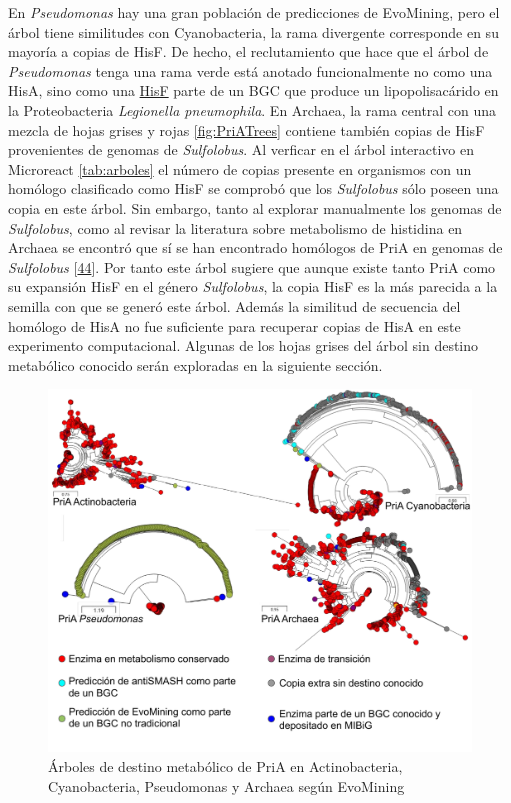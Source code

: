 \documentclass[12pt,twoside]{reedthesis}
\begin{document}
  En \emph{Pseudomonas} hay una gran población de predicciones de
  EvoMining, pero el árbol tiene similitudes con Cyanobacteria, la rama
  divergente corresponde en su mayoría a copias de HisF. De hecho, el
  reclutamiento que hace que el árbol de \emph{Pseudomonas} tenga una rama
  verde está anotado funcionalmente no como una HisA, sino como una
  \href{https://www.ncbi.nlm.nih.gov/protein/CAB65215.1/}{HisF} parte de
  un BGC que produce un lipopolisacárido en la Proteobacteria
  \emph{Legionella pneumophila}. En Archaea, la rama central con una
  mezcla de hojas grises y rojas \autoref{fig:PriATrees} contiene también
  copias de HisF provenientes de genomas de \emph{Sulfolobus}. Al verficar
  en el árbol interactivo en Microreact \autoref{tab:arboles} el número de
  copias presente en organismos con un homólogo clasificado como HisF se
  comprobó que los \emph{Sulfolobus} sólo poseen una copia en este árbol.
  Sin embargo, tanto al explorar manualmente los genomas de
  \emph{Sulfolobus}, como al revisar la literatura sobre metabolismo de
  histidina en Archaea se encontró que sí se han encontrado homólogos de
  PriA en genomas de \emph{Sulfolobus}
  {[}\protect\hyperlink{ref-fondi_evolution_2009}{44}{]}. Por tanto este
  árbol sugiere que aunque existe tanto PriA como su expansión HisF en el
  género \emph{Sulfolobus}, la copia HisF es la más parecida a la semilla
  con que se generó este árbol. Además la similitud de secuencia del
  homólogo de HisA no fue suficiente para recuperar copias de HisA en este
  experimento computacional. Algunas de los hojas grises del árbol sin
  destino metabólico conocido serán exploradas en la siguiente sección.
  
  \begin{figure}[h!tbp]
  \centering
  \includegraphics[angle = 0,scale = 0.8]{chapter4/PriAEvoMining.pdf}
  \caption[Árboles de destino metabólico de PriA en Actinobacteria, Cyanobacteria, {Pseudomonas} y Archaea según EvoMining]{\footnotesize{Árboles de destino metabólico de PriA en Actinobacteria, Cyanobacteria, {Pseudomonas} y Archaea según EvoMining}}
  \label{fig:PriATrees}
  \end{figure}
  
\end{document}
